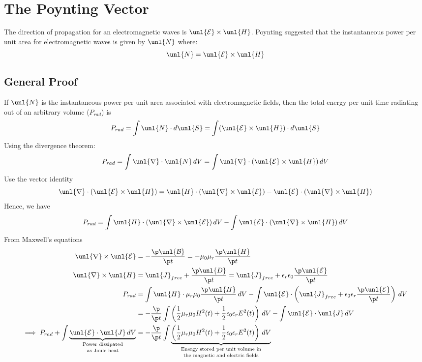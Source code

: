 \documentclass[a4paper, 11pt, normalem]{report}
\renewcommand\E{\mathcal{E}}
\newcommand\uE{\unl{\E}}
\renewcommand\B{\mathcal{B}}
\newcommand\uB{\unl{\B}}
\renewcommand\del{\unl{\nabla}}
\newcommand\eno{\epsilon_0}
\newcommand\J{\unl{J}}
\newcommand\er{\epsilon_r}
\begin{document}
\section{The Poynting Vector}
The direction of propagation for an electromagnetic waves is $\uE\times\unl{H}$.
Poynting suggested that the instantaneous power per unit area for electromagnetic waves is given by $\unl{N}$ where:
\begin{equation}
	\unl{N} = \uE\times\unl{H}
\end{equation}
\subsection{General Proof}
If $\unl{N}$ is the instantaneous power per unit area associated with electromagnetic fields, then the total energy per unit time radiating out of an arbitrary volume ($P_{rad}$) is
\begin{equation}
	P_{rad} = \int \unl{N}\cdot d\unl{S} = \int (\uE\times\unl{H})\cdot d\unl{S}
\end{equation}
Using the divergence theorem:
\begin{equation}
	P_{rad} = \int \del\cdot\unl{N}\,dV = \int \del\cdot(\uE\times\unl{H})\,dV
\end{equation}
Use the vector identity
\begin{equation}
	\del\cdot(\uE\times\unl{H}) = \unl{H}\cdot(\del\times\uE) - \uE\cdot(\del\times\unl{H})
\end{equation}
Hence, we have
\begin{equation}
	P_{rad} = \int \unl{H}\cdot(\del\times\uE)\,dV - \int \uE\cdot(\del\times\unl{H})\,dV
\end{equation}
From Maxwell's equations
\begin{align}
	\del\times\uE &= -\frac{\p\uB}{\p t} = -\mu_0\mu_r\frac{\p\unl{H}}{\p t} \\
	\del\times\unl{H} &= \J_{free} + \frac{\p \unl{D}}{\p t} = \J_{free} + \er\eno\frac{\p\uE}{\p t} \\
	P_{rad} &= \int \unl{H}\cdot\mu_r\mu_0\frac{\p\unl{H}}{\p t}\,dV - \int \uE\cdot\left(\J_{free} + \eno\er\frac{\p\uE}{\p t}\right)\,dV \\
	&= -\frac{\p}{\p t}\int \left(\frac{1}{2}\mu_r\mu_0H^2(t) + \frac{1}{2}\eno\er E^2(t)\right)\,dV - \int \uE\cdot\J\,dV \\
	\implies P_{rad} + \int \underbrace{\uE\cdot\J\,dV}_{\text{\shortstack{Power dissipated \\ as Joule heat}}} &= -\frac{\p}{\p t}\int \underbrace{\left(\frac{1}{2}\mu_r\mu_0H^2(t) + \frac{1}{2}\eno\er E^2(t)\right)\,dV}_{\text{\shortstack{Energy stored per unit volume in \\ the magnetic and electric fields}}}
\end{align}
\end{document}
